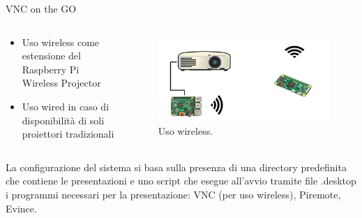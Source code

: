 \documentclass{beamer}
\begin{document}
\begin{frame}[fragile]{VNC on the GO}

\begin{columns}[T]
    \begin{column}{.37\textwidth}
    \begin{itemize}
    \item Uso wireless\newline
    \small come estensione del Raspberry Pi Wireless Projector
    \item \normalsize Uso wired\newline
    \small in caso di disponibilità di soli proiettori tradizionali\\
    \end{itemize}

    \end{column}
    \begin{column}{.61\textwidth}
    \begin{figure}
        \includegraphics[scale=1.5]{../img/setup-with-pizero.png}
        \caption{Uso wireless.}
    \end{figure}
    \end{column}
\end{columns}
\vspace{1em}

 La configurazione del sistema si basa sulla presenza di una directory predefinita che contiene le presentazioni e uno script che esegue all'avvio tramite file .desktop i programmi necessari per la presentazione: VNC (per uso wireless), Piremote, Evince.
\end{frame}
\end{document}
